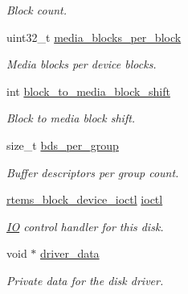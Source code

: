\begin{DoxyCompactItemize}
\begin{DoxyCompactList}\small\item\em Block count. \end{DoxyCompactList}\item 
uint32\+\_\+t \mbox{\hyperlink{structrtems__disk__device_ac667c0dbfdf48b6c18a6f90cbe06e160}{media\+\_\+blocks\+\_\+per\+\_\+block}}
\begin{DoxyCompactList}\small\item\em Media blocks per device blocks. \end{DoxyCompactList}\item 
int \mbox{\hyperlink{structrtems__disk__device_ae73934f4f4c98238e99b5d0240933544}{block\+\_\+to\+\_\+media\+\_\+block\+\_\+shift}}
\begin{DoxyCompactList}\small\item\em Block to media block shift. \end{DoxyCompactList}\item 
size\+\_\+t \mbox{\hyperlink{structrtems__disk__device_a3afc4d8f96a873b8e2340b8e978584c6}{bds\+\_\+per\+\_\+group}}
\begin{DoxyCompactList}\small\item\em Buffer descriptors per group count. \end{DoxyCompactList}\item 
\mbox{\label{structrtems__disk__device_a205ac2a3badb51b50bb82e1256778623}} 
\mbox{\hyperlink{group__rtems__disk_gacbf717f10129b976deaf8e6f4deb17ad}{rtems\+\_\+block\+\_\+device\+\_\+ioctl}} \mbox{\hyperlink{structrtems__disk__device_a205ac2a3badb51b50bb82e1256778623}{ioctl}}
\begin{DoxyCompactList}\small\item\em \mbox{\hyperlink{structIO}{IO}} control handler for this disk. \end{DoxyCompactList}\item 
\mbox{\label{structrtems__disk__device_a21195079ef538a350af2091b778706f3}} 
void $\ast$ \mbox{\hyperlink{structrtems__disk__device_a21195079ef538a350af2091b778706f3}{driver\+\_\+data}}
\begin{DoxyCompactList}\small\item\em Private data for the disk driver. \end{DoxyCompactList}\item 
\mbox{\label{structrtems__disk__device_aaa1f93e5ae3f153a048a78490acef04e}} 

\end{DoxyCompactItemize}

